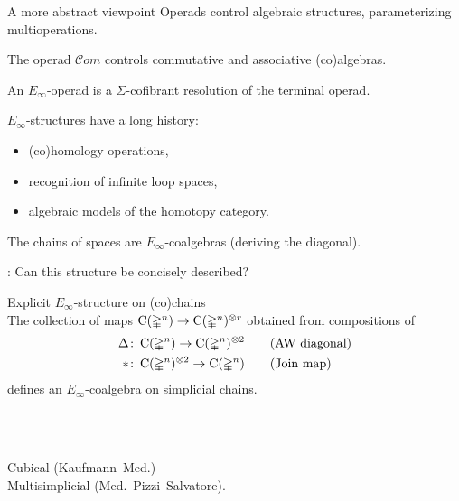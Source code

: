 \begin{frame}{A more abstract viewpoint}
	\pause
	Operads control algebraic structures, parameterizing multioperations.

	\bigskip\pause
	The operad $\mathcal{C}om$ controls commutative and associative (co)algebras.

	\bigskip\pause
	An $E_\infty$-operad is a $\Sigma$-cofibrant resolution of the terminal operad.

	\bigskip\pause
	$E_\infty$-structures have a long history:
	\smallskip\pause
	\begin{itemize}
		\item (co)homology operations,
		\item recognition of infinite loop spaces,
		\item algebraic models of the homotopy category.
	\end{itemize}

	\bigskip\pause
	The chains of spaces are $E_\infty$-coalgebras (deriving the diagonal).

	\bigskip\pause
	: Can this structure be concisely described?
\end{frame}

\begin{frame}{Explicit $E_\infty$-structure on (co)chains}
	\pause
	 \\
	The collection of maps $\operatorname{C}(\mathbb{\Delta}^n) \to \operatorname{C}(\mathbb{\Delta}^n)^{\otimes r}$ obtained from compositions of
	\begin{align*}
		\Delta &\colon \operatorname{C}(\mathbb{\Delta}^n) \to \operatorname{C}(\mathbb{\Delta}^n)^{\otimes 2}
		\qquad \text{(AW diagonal)} \\
		\ast &\colon \operatorname{C}(\mathbb{\Delta}^n)^{\otimes 2} \to \operatorname{C}(\mathbb{\Delta}^n)
		\qquad \text{(Join map)}
	\end{align*}
	defines an $E_\infty$-coalgebra on simplicial chains.

	\bigskip\pause
	 \\
	\qquad\qquad \scalebox{0.7}{}

	\bigskip\pause
	 \\
	Cubical (Kaufmann--Med.) \\
	Multisimplicial (Med.--Pizzi--Salvatore).
\end{frame}

